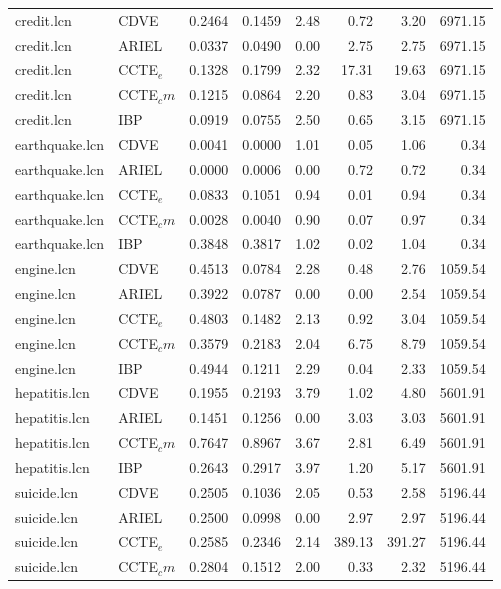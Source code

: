 \documentclass{article}
\begin{document}
\begin{table}[t]
{\begin{tabular}{llrrrrrr}
\hline
credit.lcn & CDVE & 0.2464 & 0.1459 & 2.48 & 0.72 & 3.20 & 6971.15  \\
credit.lcn & ARIEL & 0.0337 & 0.0490 & 0.00 & 2.75 & 2.75 & 6971.15  \\
credit.lcn & CCTE$_e$ & 0.1328 & 0.1799 & 2.32 & 17.31 & 19.63 & 6971.15  \\
credit.lcn & CCTE$_cm$ & 0.1215 & 0.0864 & 2.20 & 0.83 & 3.04 & 6971.15  \\
credit.lcn & IBP & 0.0919 & 0.0755 & 2.50 & 0.65 & 3.15 & 6971.15  \\
\hline
earthquake.lcn & CDVE & 0.0041 & 0.0000 & 1.01 & 0.05 & 1.06 & 0.34  \\
earthquake.lcn & ARIEL & 0.0000 & 0.0006 & 0.00 & 0.72 & 0.72 & 0.34\\
earthquake.lcn & CCTE$_e$ & 0.0833 & 0.1051 & 0.94 & 0.01 & 0.94 & 0.34  \\
earthquake.lcn & CCTE$_cm$ & 0.0028 & 0.0040 & 0.90 & 0.07 & 0.97 & 0.34  \\
earthquake.lcn & IBP & 0.3848 & 0.3817 & 1.02 & 0.02 & 1.04 & 0.34  \\
\hline
engine.lcn & CDVE & 0.4513 & 0.0784 & 2.28 & 0.48 & 2.76 & 1059.54  \\
engine.lcn & ARIEL & 0.3922 & 0.0787 & 0.00 & 0.00 & 2.54 &  1059.54 \\
engine.lcn & CCTE$_e$ & 0.4803 & 0.1482 & 2.13 & 0.92 & 3.04 & 1059.54  \\
engine.lcn & CCTE$_cm$ & 0.3579 &  0.2183 &  2.04 & 6.75 & 8.79 & 1059.54  \\
engine.lcn & IBP & 0.4944 & 0.1211 & 2.29 & 0.04 & 2.33 & 1059.54 \\
\hline
hepatitis.lcn & CDVE & 0.1955 & 0.2193 & 3.79 & 1.02 & 4.80 & 5601.91  \\
hepatitis.lcn & ARIEL & 0.1451 & 0.1256 & 0.00 & 3.03 & 3.03 & 5601.91 \\
hepatitis.lcn & CCTE$_cm$ & 0.7647 & 0.8967 & 3.67 & 2.81 & 6.49 & 5601.91  \\
hepatitis.lcn & IBP & 0.2643 & 0.2917 & 3.97 & 1.20 & 5.17 & 5601.91  \\
\hline
suicide.lcn & CDVE & 0.2505 & 0.1036 & 2.05 & 0.53 & 2.58 & 5196.44  \\
suicide.lcn & ARIEL & 0.2500 & 0.0998 & 0.00 & 2.97 & 2.97 & 5196.44  \\
suicide.lcn & CCTE$_e$ & 0.2585 & 0.2346 & 2.14 & 389.13 & 391.27 & 5196.44  \\
suicide.lcn & CCTE$_cm$ & 0.2804 & 0.1512 & 2.00 & 0.33 & 2.32 & 5196.44  \\

\end{tabular}}
\end{table}
\end{document}
